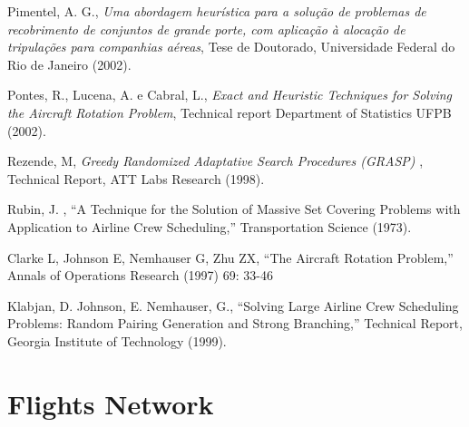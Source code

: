 \documentclass{endm}
\begin{document}
\begin{thebibliography}{10}\label{bibliography}

 Pimentel, A. G., \emph{Uma abordagem heur\'istica para a solu\c{c}\~ao de problemas de recobrimento de conjuntos de grande porte, com aplica\c{c}\~ao \`a aloca\c{c}\~ao de tripula\c{c}\~oes para companhias a\'ereas}, Tese de Doutorado, Universidade Federal do Rio de Janeiro (2002).

 Pontes, R., Lucena, A. e Cabral, L., \emph{Exact and Heuristic Techniques for Solving the Aircraft
Rotation Problem}, Technical report Department of Statistics UFPB (2002).

 Rezende, M, \emph{Greedy Randomized Adaptative Search Procedures (GRASP) }, Technical 
Report, ATT Labs Research (1998).
  
  Rubin, J. , ``A Technique for the Solution of Massive Set Covering Problems with Application 
to Airline Crew Scheduling,'' Transportation Science (1973).
  
  Clarke L, Johnson E, Nemhauser G, Zhu ZX, ``The Aircraft Rotation Problem,'' Annals of 
Operations Research (1997) 69: 33-46
  
 Klabjan, D. Johnson, E. Nemhauser, G., ``Solving Large Airline Crew Scheduling 
Problems: Random Pairing Generation and Strong Branching,'' Technical Report, Georgia Institute of 
Technology (1999).  

\end{thebibliography}



\appendix

\newpage
\section{Flights Network}
\end{document}

